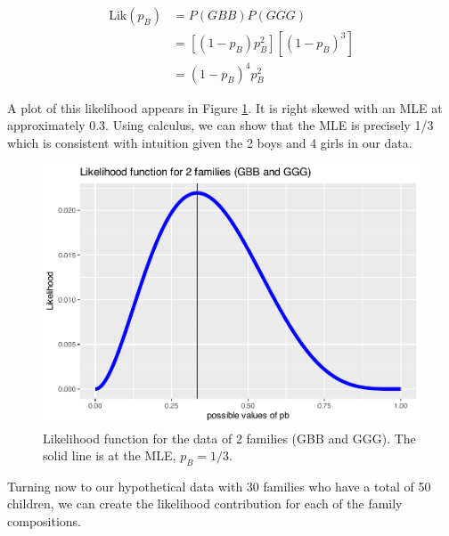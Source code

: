 \documentclass[
]{krantz}
\newcommand{\lik}{\mathrm{Lik}}
\begin{document}
\begin{align*}
 \lik (p_B) &= P(GBB)P(GGG) \\
            &= [(1-p_B)p_B^2][(1-p_B)^3] \\
            &= (1-p_B)^4p_B^2
\end{align*}

A plot of this likelihood appears in Figure \ref{fig:lik2}. It is right skewed with an MLE at approximately 0.3. Using calculus, we can show that the MLE is precisely 1/3 which is consistent with intuition given the 2 boys and 4 girls in our data.

\begin{figure}

{\centering \includegraphics[width=0.9\linewidth]{bookdown-BeyondMLR_files/figure-latex/lik2-1} 

}

\caption{Likelihood function for the data of 2 families (GBB and GGG). The solid line is at the MLE,  ${p}_B=1/3$.}\label{fig:lik2}
\end{figure}

Turning now to our hypothetical data with 30 families who have a total of 50 children, we can create the likelihood contribution for each of the family compositions.
\end{document}
